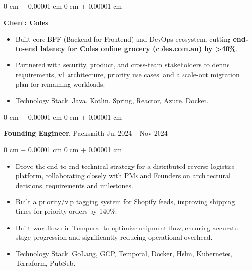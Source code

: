 \documentclass[10pt, letterpaper]{article}
\newenvironment{highlights}{
    \begin{itemize}[
        topsep=0.10 cm,
        parsep=0.10 cm,
        partopsep=0pt,
        itemsep=0pt,
        leftmargin=0 cm + 10pt
    ]
}{
    \end{itemize}
} %
\newenvironment{onecolentry}{
    \begin{adjustwidth}{
        0 cm + 0.00001 cm
    }{
        0 cm + 0.00001 cm
    }
}{
    \end{adjustwidth}
} %
\newenvironment{twocolentry}[2][]{
    \onecolentry
    \def\secondColumn{#2}
    \setcolumnwidth{\fill, 4.5 cm}
    \begin{paracol}{2}
}{
    \switchcolumn \raggedleft \secondColumn
    \end{paracol}
    \endonecolentry
} %
\begin{document}
\begin{onecolentry}
            \vspace{0.10 cm}
            \hspace{0.5cm}\textbf{Client: Coles}
            \begin{itemize}[
                topsep=0.10 cm,
                parsep=0.10 cm,
                partopsep=0pt,
                itemsep=0pt,
                leftmargin=0 cm + 10pt + 0.5cm
            ]
                \item Built core BFF (Backend-for-Frontend) and DevOps ecosystem, cutting \textbf{end-to-end latency for Coles online grocery (coles.com.au) by >40\%}.
                \item Partnered with security, product, and cross-team stakeholders to define requirements, v1 architecture, priority use cases, and a scale-out migration plan for remaining workloads.
                \item Technology Stack: Java, Kotlin, Spring, Reactor, Azure, Docker.
            \end{itemize}
        \end{onecolentry}

        \vspace{0.15 cm}
        \begin{twocolentry}{
            Jul 2024 – Nov 2024
        }
            \textbf{Founding Engineer}, Packsmith\end{twocolentry}

        \vspace{0.10 cm}
        \begin{onecolentry}
            \begin{highlights}
                \item Drove the end-to-end technical strategy for a distributed reverse logistics platform, collaborating closely with PMs and Founders on architectural decisions, requirements and milestones.
                \item Built a priority/vip tagging system for Shopify feeds, improving shipping times for priority orders by 140\%.
                \item Built workflows in Temporal to optimize shipment flow, ensuring accurate stage progression and significantly reducing operational overhead.
                \item Technology Stack: GoLang, GCP, Temporal, Docker, Helm, Kubernetes, Terraform, PubSub.
            \end{highlights}
        \end{onecolentry}
        
\end{document}
